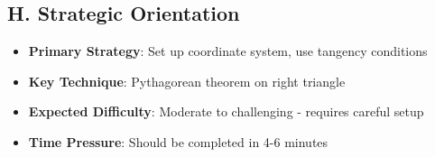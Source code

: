 \documentclass[11pt]{article}
\begin{document}
\begin{problembox}
\subsection*{H. Strategic Orientation}
\begin{itemize}[leftmargin=*]
    \item \textbf{Primary Strategy}: Set up coordinate system, use tangency conditions
    \item \textbf{Key Technique}: Pythagorean theorem on right triangle
    \item \textbf{Expected Difficulty}: Moderate to challenging - requires careful setup
    \item \textbf{Time Pressure}: Should be completed in 4-6 minutes
\end{itemize}
\end{problembox}
\end{document}
